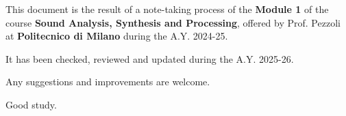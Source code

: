 \setcounter{page}{0}
\thispagestyle{nohead}

\vspace*{\fill}
\begin{center}
This document is the result of a note-taking process of the \textbf{Module 1} of the course \textbf{Sound Analysis, Synthesis and Processing}, offered by Prof. Pezzoli at \textbf{Politecnico di Milano} during the A.Y. 2024-25.

It has been checked, reviewed and updated during the A.Y. 2025-26.

Any suggestions and improvements are welcome.

Good study.
\end{center}
\vspace*{\fill}

\clearpage
